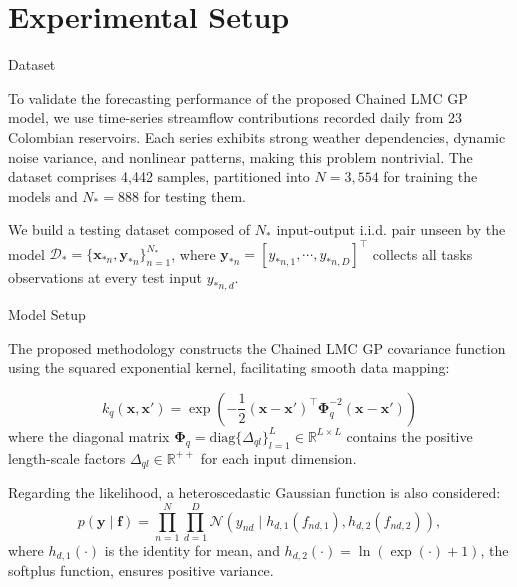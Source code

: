 \section{Experimental Setup}

\begin{frame}{Dataset}

\begin{block}{}
	To validate the forecasting performance of the proposed Chained LMC GP model, we use time-series streamflow contributions recorded daily from 23 Colombian reservoirs. Each series exhibits strong weather dependencies, dynamic noise variance, and nonlinear patterns, making this problem nontrivial. The dataset comprises 4,442 samples, partitioned into \(N=3,554\) for training the models and \(N_*=888\) for testing them.
\end{block}
	
\begin{block}{}
	We build a testing dataset composed of \( N_* \) input-output i.i.d. pair unseen by the model \( \mathcal{D}_* = \{\boldsymbol{x}_{*n}, \boldsymbol{y}_{*n}\}_{n=1}^{N_*} \), where \( \boldsymbol{y}_{*n} = [y_{*n,1}, \cdots, y_{*n, D}]^\top \) collects all tasks observations at every test input \( y_{*n,d}\).
\end{block}
	
\end{frame}

\begin{frame}{Model Setup}

The proposed methodology constructs the Chained LMC GP covariance function using the squared exponential kernel, facilitating smooth data mapping:

\begin{equation}\label{eq:nonscaled_squared_exponential_kernel}
	k_{q}\left(\boldsymbol{x}, \boldsymbol{x}' \right) = \exp\left(-\frac{1}{2}(\boldsymbol{x} - \boldsymbol{x}')^\top \boldsymbol{\Phi}_q^{-2} (\boldsymbol{x} - \boldsymbol{x}')\right)
\end{equation}
where the diagonal matrix \( \boldsymbol{\Phi}_q=\text{diag}\{\Delta_{ql}\}_{l=1}^{L} \in \mathbb{R}^{L \times L} \) contains the positive length-scale factors \( \Delta_{ql}\in\mathbb{R}^{++} \) for each input dimension.

Regarding the likelihood, a heteroscedastic Gaussian function is also considered:
\begin{equation}\label{eq:gaussian_het_likelihood}
	p(\boldsymbol{y} \mid \boldsymbol{f}) = \prod_{n=1}^{N}\prod_{d=1}^{D} \mathcal{N}\left(y_{nd} \mid h_{d,1}(f_{nd,1}), h_{d,2}(f_{nd,2}) \right),
\end{equation}
where $h_{d,1}(\cdot)$ is the identity for mean, and $h_{d,2}(\cdot) = \ln(\exp(\cdot)+1)$, the softplus function, ensures positive variance.

\end{frame}


